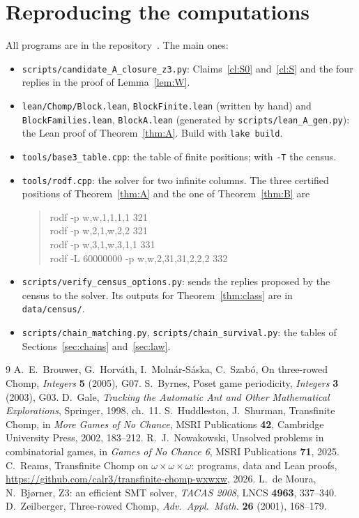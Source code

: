 \documentclass[11pt]{amsart}
\theoremstyle{definition}
\theoremstyle{remark}
\begin{document}
\section{Reproducing the computations}
All programs are in the repository~\cite{repo}. The main ones:
\begin{itemize}
\item \texttt{scripts/candidate\_A\_closure\_z3.py}: Claims~\ref{cl:S0} and~\ref{cl:S} and the
four replies in the proof of Lemma~\ref{lem:W}.
\item \texttt{lean/Chomp/Block.lean}, \texttt{BlockFinite.lean} (written by hand) and
\texttt{BlockFamilies.lean}, \texttt{BlockA.lean} (generated by
\texttt{scripts/lean\_A\_gen.py}): the Lean proof of Theorem~\ref{thm:A}. Build with
\texttt{lake build}.
\item \texttt{tools/base3\_table.cpp}: the table of finite positions; with \texttt{-T} the
census.
\item \texttt{tools/rodf.cpp}: the solver for two infinite columns. The three certified
positions of Theorem~\ref{thm:A} and the one of Theorem~\ref{thm:B} are
\begin{quote}\ttfamily
rodf -p w,w,1,1,1,1 321\\
rodf -p w,2,1,w,2,2 321\\
rodf -p w,3,1,w,3,1,1 331\\
rodf -L 60000000 -p w,w,2,31,31,2,2,2 332
\end{quote}
\item \texttt{scripts/verify\_census\_options.py}: sends the replies proposed by the census
to the solver. Its outputs for Theorem~\ref{thm:class} are in \texttt{data/census/}.
\item \texttt{scripts/chain\_matching.py}, \texttt{scripts/chain\_survival.py}: the tables of
Sections~\ref{sec:chains} and~\ref{sec:law}.
\end{itemize}

\begin{thebibliography}{9}
 A.~E.~Brouwer, G.~Horv\'ath, I.~Moln\'ar-S\'aska, C.~Szab\'o, On three-rowed
  Chomp, \emph{Integers} \textbf{5} (2005), G07.
 S.~Byrnes, Poset game periodicity, \emph{Integers} \textbf{3} (2003), G03.
 D.~Gale, \emph{Tracking the Automatic Ant and Other Mathematical Explorations},
  Springer, 1998, ch.~11.
 S.~Huddleston, J.~Shurman, Transfinite Chomp, in \emph{More Games of No Chance},
  MSRI Publications \textbf{42}, Cambridge University Press, 2002, 183--212.
 R.~J.~Nowakowski, Unsolved problems in combinatorial games, in \emph{Games of
  No Chance 6}, MSRI Publications \textbf{71}, 2025.
 C.~Reams, Transfinite Chomp on $\omega\times\omega\times\omega$: programs, data and
  Lean proofs, \url{https://github.com/calr3/transfinite-chomp-wxwxw}, 2026.
 L.~de Moura, N.~Bj{\o}rner, Z3: an efficient SMT solver, \emph{TACAS 2008},
  LNCS \textbf{4963}, 337--340.
 D.~Zeilberger, Three-rowed Chomp, \emph{Adv.\ Appl.\ Math.} \textbf{26} (2001),
  168--179.
\end{thebibliography}
\end{document}
